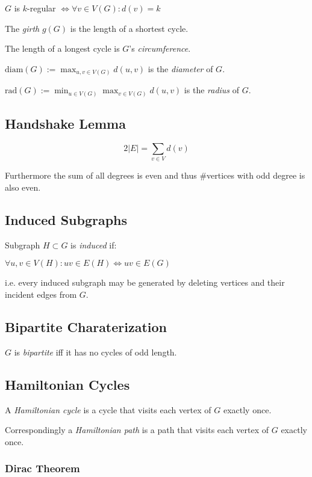 \spacing

$G$ is $k$-regular $\iff \forall v \in V(G) : d(v) = k$

The \emph{girth} $g(G)$ is the length of a shortest cycle.

The length of a longest cycle is $G$'s \emph{circumference}.

\spacing

$\text{diam}(G) := \displaystyle\max_{u,v \in V(G)} d(u,v)$ is the \emph{diameter} of $G$.

\spacing

$\text{rad}(G) := \displaystyle\min_{u \in V(G)} \max_{v \in V(G)} d(u,v)$ is the \emph{radius} of $G$.

\subsection*{Handshake Lemma}

\[ 2|E| = \sum_{v \in V} d(v) \]

Furthermore the sum of all degrees is even and thus \#vertices with odd degree is also even.

\subsection*{Induced Subgraphs}

Subgraph $H \subset G$ is \emph{induced} if:

$\forall u, v \in V(H) : uv \in E(H) \iff uv \in E(G)$

i.e. every induced subgraph may be generated by deleting vertices and their incident edges from $G$.

\subsection*{Bipartite Charaterization}

$G$ is \emph{bipartite} iff it has no cycles of odd length.

\subsection*{Hamiltonian Cycles}

A \emph{Hamiltonian cycle} is a cycle that visits each vertex of $G$ exactly once.

Correspondingly a \emph{Hamiltonian path} is a path that visits each vertex of $G$ exactly once.

\subsubsection*{Dirac Theorem}

